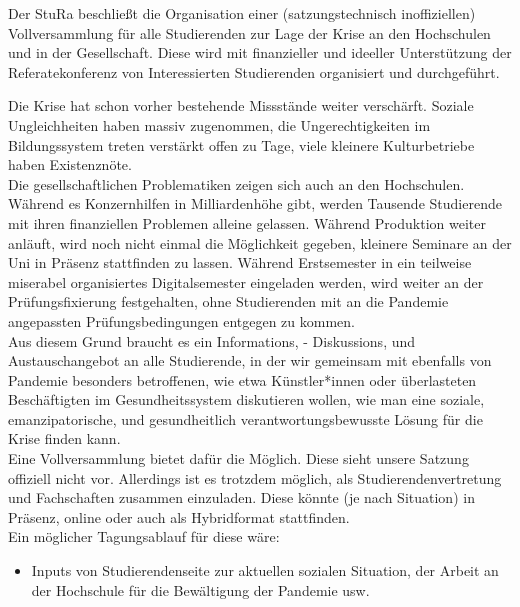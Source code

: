     {
        Der StuRa beschließt die Organisation einer (satzungstechnisch inoffiziellen) Vollversammlung
        für alle Studierenden zur Lage der Krise an den Hochschulen und in der Gesellschaft.
        Diese wird mit finanzieller und ideeller Unterstützung der Referatekonferenz von Interessierten
        Studierenden organisiert und durchgeführt. 
    }{
        Die Krise hat schon vorher bestehende Missstände weiter verschärft. Soziale Ungleichheiten haben
        massiv zugenommen, die Ungerechtigkeiten im Bildungssystem treten verstärkt offen zu Tage, viele
        kleinere Kulturbetriebe haben Existenznöte.\\
        Die gesellschaftlichen Problematiken zeigen sich auch an den Hochschulen. Während es Konzernhilfen
        in Milliardenhöhe gibt, werden Tausende Studierende mit ihren finanziellen Problemen alleine
        gelassen. Während Produktion weiter anläuft, wird noch nicht einmal die Möglichkeit gegeben,
        kleinere Seminare an der Uni in Präsenz stattfinden zu lassen. Während Erstsemester in ein
        teilweise miserabel organisiertes Digitalsemester eingeladen werden, wird weiter an der
        Prüfungsfixierung festgehalten, ohne Studierenden mit an die Pandemie angepassten Prüfungsbedingungen
        entgegen zu kommen.\\
        Aus diesem Grund braucht es ein Informations, - Diskussions, und Austauschangebot an alle 
        Studierende, in der wir gemeinsam mit ebenfalls von Pandemie besonders betroffenen, wie etwa
        Künstler*innen oder überlasteten Beschäftigten im Gesundheitssystem diskutieren wollen, wie man eine
        soziale, emanzipatorische, und gesundheitlich verantwortungsbewusste Lösung für die Krise finden
        kann.\\
        Eine Vollversammlung bietet dafür die Möglich. Diese sieht unsere Satzung offiziell nicht vor.
        Allerdings ist es trotzdem möglich, als Studierendenvertretung und Fachschaften zusammen einzuladen.
        Diese könnte (je nach Situation) in Präsenz, online oder auch als Hybridformat stattfinden.\\
        Ein möglicher Tagungsablauf für diese wäre:\\
        \begin{itemize}
            \item Inputs von Studierendenseite zur aktuellen sozialen Situation, der Arbeit an der Hochschule
                für die Bewältigung der Pandemie usw.

\end{itemize}}
